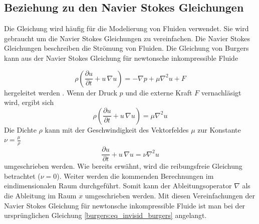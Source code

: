 	\subsection{Beziehung zu den Navier Stokes Gleichungen}
		Die Gleichung wird häufig für die Modelierung von Fluiden verwendet.
		Sie wird gebraucht um die Navier Stokes Gleichungen zu vereinfachen.
		Die Navier Stokes Gleichungen beschreiben die Str\"omung von Fluiden.
		Die Gleichung von Burgers kann aus der Navier Stokes Gleichung f\"ur newtonsche inkompressible Fluide

		\begin{equation}
			\rho \left(\frac{\partial u}{\partial t} + u \, \nabla u \right) = -\nabla p + \mu \nabla^2 u + F
			\label{burgers:eq_navier}
		\end{equation}
		hergeleitet werden \cite{burgers:navier}.
		Wenn der Druck $p$ und die externe Kraft $F$ vernachl\"asigt wird, ergibt sich
		\begin{equation}
			\rho \left(\frac{\partial u}{\partial t} + u \, \nabla u \right) = \mu \nabla^2 u
			 \label{burgers:eq_navier2}
		\end{equation}
		Die Dichte $\rho$ kann mit der Geschwindigkeit des Vektorfeldes $\mu$ zur Konstante $\nu = \frac{\mu}{\rho}$
		\begin{equation}
			 \frac{\partial u}{\partial t} + u \,\nabla u = \nu \nabla^2 u
			 \label{burgers:eq_navier3}
		\end{equation}
		umgeschrieben werden.
		Wie bereits erw\"ahnt, wird die reibungsfreie Gleichung betrachtet ($\nu = 0$).
		Weiter werden die kommenden Berechnungen im eindimensionalen Raum durchgef\"uhrt.
		Somit kann der Ableitungsoperator $\nabla$ als die Ableitung im Raum $x$ umgeschrieben werden.
		Mit diesen Vereinfachungen der Navier Stokes Gleichung f\"ur newtonsche inkompressible Fluide ist man bei der urspr\"unglichen Gleichung \eqref{burgers:eq_invisid_burgers} angelangt.

